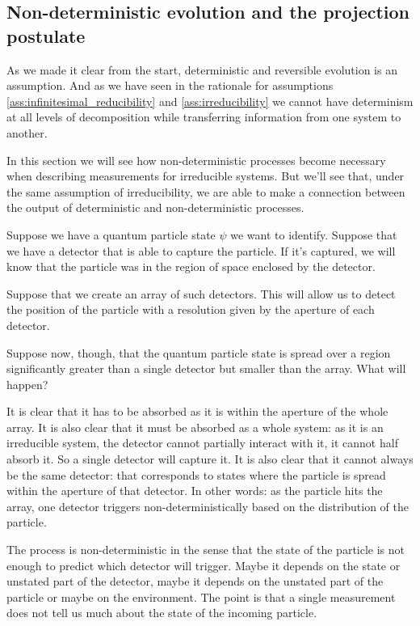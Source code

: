 \documentclass[smallextended]{svjour3}
\numberwithin{equation}{section}
\theoremstyle{definition}
\begin{document}
\subsection{Non-deterministic evolution and the projection postulate}

As we made it clear from the start, deterministic and reversible evolution is an assumption. And as we have seen in the rationale for assumptions \ref{ass:infinitesimal_reducibility} and \ref{ass:irreducibility} we cannot have determinism at all levels of decomposition while transferring information from one system to another.

In this section we will see how non-deterministic processes become necessary when describing measurements for irreducible systems. But we'll see that, under the same assumption of irreducibility, we are able to make a connection between the output of deterministic and non-deterministic processes.

Suppose we have a quantum particle state $\psi$ we want to identify. Suppose that we have a detector that is able to capture the particle. If it's captured, we will know that the particle was in the region of space enclosed by the detector.

Suppose that we create an array of such detectors. This will allow us to detect the position of the particle with a resolution given by the aperture of each detector.

Suppose now, though, that the quantum particle state is spread over a region significantly greater than a single detector but smaller than the array. What will happen?

It is clear that it has to be absorbed as it is within the aperture of the whole array. It is also clear that it must be absorbed as a whole system: as it is an irreducible system, the detector cannot partially interact with it, it cannot half absorb it. So a single detector will capture it. It is also clear that it cannot always be the same detector: that corresponds to states where the particle is spread within the aperture of that detector. In other words: as the particle hits the array, one detector triggers non-deterministically based on the distribution of the particle.

The process is non-deterministic in the sense that the state of the particle is not enough to predict which detector will trigger. Maybe it depends on the state or unstated part of the detector, maybe it depends on the unstated part of the particle or maybe on the environment. The point is that a single measurement does not tell us much about the state of the incoming particle.
\end{document}
